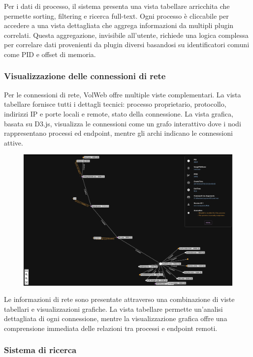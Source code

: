 Per i dati di processo, il sistema presenta una vista tabellare arricchita che permette sorting, filtering e ricerca full-text. Ogni processo è cliccabile per accedere a una vista dettagliata che aggrega informazioni da multipli plugin correlati. Questa aggregazione, invisibile all'utente, richiede una logica complessa per correlare dati provenienti da plugin diversi basandosi su identificatori comuni come PID e offset di memoria.

\subsubsection{Visualizzazione delle connessioni di rete}

Per le connessioni di rete, VolWeb offre multiple viste complementari. La vista tabellare fornisce tutti i dettagli tecnici: processo proprietario, protocollo, indirizzi IP e porte locali e remote, stato della connessione. La vista grafica, basata su D3.js, visualizza le connessioni come un grafo interattivo dove i nodi rappresentano processi ed endpoint, mentre gli archi indicano le connessioni attive.

\begin{figure}[H]
    \centering
    \includegraphics[width=0.9\linewidth]{images/volweb-original/volweb-network-graph.png}
\end{figure}

Le informazioni di rete sono presentate attraverso una combinazione di viste tabellari e visualizzazioni grafiche. La vista tabellare permette un'analisi dettagliata di ogni connessione, mentre la visualizzazione grafica offre una comprensione immediata delle relazioni tra processi e endpoint remoti.

\subsubsection{Sistema di ricerca}

